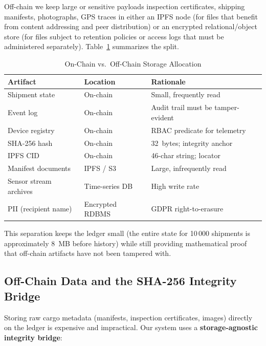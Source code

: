 \documentclass[conference]{IEEEtran}
\begin{document}
Off-chain we keep large or sensitive payloads  inspection certificates,
shipping manifests, photographs, GPS traces  in either an IPFS node
(for files that benefit from content addressing and peer distribution) or
an encrypted relational/object store (for files subject to retention
policies or access logs that must be administered separately).
Table~\ref{tab:storage} summarizes the split.

\begin{table}[!t]
\caption{On-Chain vs.\ Off-Chain Storage Allocation}
\label{tab:storage}
\centering
\footnotesize
\renewcommand{\arraystretch}{1.1}
\begin{tabularx}{\columnwidth}{@{}l l X@{}}
\toprule
\textbf{Artifact} & \textbf{Location} & \textbf{Rationale} \\
\midrule
Shipment state         & On-chain            & Small, frequently read \\
Event log              & On-chain            & Audit trail must be tamper-evident \\
Device registry        & On-chain            & RBAC predicate for telemetry \\
SHA-256 hash           & On-chain            & 32~bytes; integrity anchor \\
IPFS CID               & On-chain            & 46-char string; locator \\
Manifest documents     & IPFS / S3           & Large, infrequently read \\
Sensor stream archives & Time-series DB      & High write rate \\
PII (recipient name)   & Encrypted RDBMS     & GDPR right-to-erasure \\
\bottomrule
\end{tabularx}
\end{table}

This separation keeps the ledger small (the entire state for 10\,000
shipments is approximately 8~MB before history) while still providing
mathematical proof that off-chain artifacts have not been tampered with.

\subsection{Off-Chain Data and the SHA-256 Integrity Bridge}
\label{sec:offchain}

Storing raw cargo metadata (manifests, inspection certificates, images)
directly on the ledger is expensive and impractical.  Our system uses a
\textbf{storage-agnostic integrity bridge}:
\end{document}
